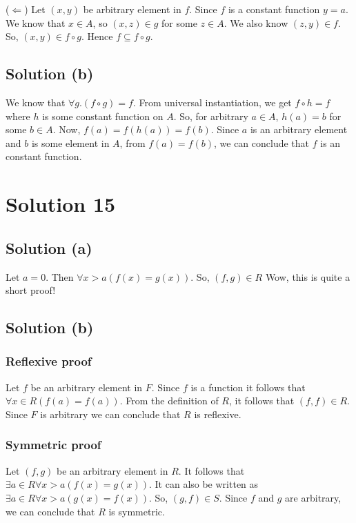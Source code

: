 \documentclass{article}
\begin{document}
($\Leftarrow$) Let $(x,y)$ be arbitrary element in $f$. Since $f$ is a
constant function $y = a$. We know that $x \in A$, so $(x,z) \in g$
for some $z \in A$. We also know $(z,y) \in f$. So, $(x,y) \in f \circ
g$. Hence $f \subseteq f \circ g$.

\subsection{Solution (b)}
We know that $\forall g. (f \circ g) = f$. From universal
instantiation, we get $f \circ h = f$ where $h$ is some constant
function on $A$. So, for arbitrary $a \in A$, $h(a) = b$ for some
$b \in A$. Now, $f(a) = f(h(a)) = f(b)$. Since $a$ is an arbitrary
element and $b$ is some element in $A$, from $f(a) = f(b)$, we can
conclude that $f$ is an constant function.

\section{Solution 15}
\subsection{Solution (a)}
Let $a = 0$. Then $\forall x > a(f(x) = g(x))$. So, $(f,g) \in R$
Wow, this is quite a short proof!

\subsection{Solution (b)}
\subsubsection{Reflexive proof}
Let $f$ be an arbitrary element in $F$. Since $f$ is a function it
follows that $\forall x \in R(f(a) = f(a))$. From the definition of
$R$, it follows that $(f,f) \in R$. Since $F$ is arbitrary we can
conclude that $R$ is reflexive.
\subsubsection{Symmetric proof}
Let $(f,g)$ be an arbitrary element in $R$. It follows that $\exists a
\in R \forall x > a (f(x) = g(x))$. It can also be written as $\exists a
\in R \forall x > a (g(x) = f(x))$. So, $(g,f) \in S$. Since $f$ and
$g$ are arbitrary, we can conclude that $R$ is symmetric.
\end{document}

